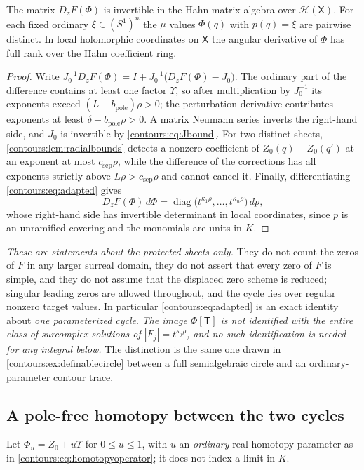 \documentclass[11pt,letterpaper]{article}
\theoremstyle{definition}
\theoremstyle{remark}
\newcommand{\HH}{\mathcal H}\newcommand{\A}{\mathscr A}\newcommand{\OO}{\mathcal O}
\numberwithin{equation}{section}
\begin{document}
\begin{corollary}
\label{contours:cor:protectedsheets}
The matrix $D_zF(\Phi)$ is invertible in the Hahn matrix algebra over
$\HH(\mathsf X)$. For each fixed ordinary $\xi\in(S^1)^n$ the $\mu$ values
$\Phi(q)$ with $p(q)=\xi$ are pairwise distinct. In local holomorphic
coordinates on $\mathsf X$ the angular derivative of $\Phi$ has full rank over
the Hahn coefficient ring.
\end{corollary}
\begin{proof}
Write $J_0^{-1}D_zF(\Phi)=I+J_0^{-1}\bigl(D_zF(\Phi)-J_0\bigr)$. The ordinary
part of the difference contains at least one factor $\Upsilon$, so after
multiplication by $J_0^{-1}$ its exponents exceed
$(L-b_{\mathrm{pole}})\rho>0$; the perturbation derivative contributes exponents
at least $\delta-b_{\mathrm{pole}}\rho>0$. A matrix Neumann series inverts the
right-hand side, and $J_0$ is invertible by \eqref{contours:eq:Jbound}. For two
distinct sheets, \cref{contours:lem:radialbounds} detects a nonzero coefficient
of $Z_0(q)-Z_0(q')$ at an exponent at most $c_{\mathrm{sep}}\rho$, while the
difference of the corrections has all exponents strictly above
$L\rho>c_{\mathrm{sep}}\rho$ and cannot cancel it. Finally, differentiating
\eqref{contours:eq:adapted} gives
\[
  D_zF(\Phi)\,d\Phi
  =\operatorname{diag}\bigl(t^{\kappa_1\rho},\ldots,t^{\kappa_n\rho}\bigr)\,dp,
\]
whose right-hand side has invertible determinant in local coordinates, since $p$
is an unramified covering and the monomials are units in $K$.
\end{proof}

\emph{These are statements about the protected sheets only.} They do not count
the zeros of $F$ in any larger surreal domain, they do not assert that every
zero of $F$ is simple, and they do not assume that the displaced zero scheme is
reduced; singular leading zeros are allowed throughout, and the cycle lies over
regular nonzero target values. In particular \eqref{contours:eq:adapted} is an
exact identity about \emph{one parameterized cycle}. \emph{The image
$\Phi[\mathsf T]$ is not identified with the entire class of surcomplex
solutions of $|F_j|=t^{\kappa_j\rho}$, and no such identification is needed for
any integral below.} The distinction is the same one drawn in
\cref{contours:ex:definablecircle} between a full semialgebraic circle and an
ordinary-parameter contour trace.

\subsection{A pole-free homotopy between the two cycles}
\label{contours:subsec:polefree}
Let $\Phi_u=Z_0+u\Upsilon$ for $0\le u\le1$, with $u$ an \emph{ordinary} real
homotopy parameter as in \eqref{contours:eq:homotopyoperator}; it does not index
a limit in $K$.
\end{document}
